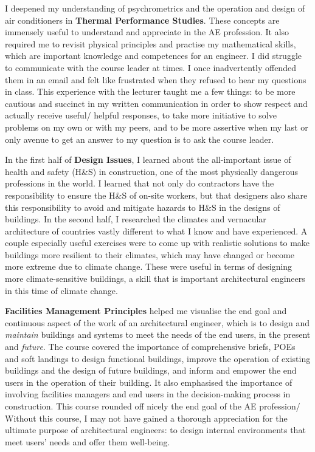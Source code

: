 I deepened my understanding of psychrometrics and the operation and design of air conditioners in \textbf{Thermal Performance Studies}.
These concepts are immensely useful to understand and appreciate in the AE profession.
It also required me to revisit physical principles and practise my mathematical skills, which are important knowledge and competences for an engineer.
I did struggle to communicate with the course leader at times.
I once inadvertently offended them in an email and felt like frustrated when they refused to hear my questions in class.
This experience with the lecturer taught me a few things: to be more cautious and succinct in my written communication in order to show respect and actually receive useful/ helpful responses, to take more initiative to solve problems on my own or with my peers, and to be more assertive when my last or only avenue to get an answer to my question is to ask the course leader.

In the first half of \textbf{Design Issues}, I learned about the all-important issue of health and safety (H\&S) in construction, one of the most physically dangerous professions in the world.
I learned that not only do contractors have the responsibility to ensure the H\&S of on-site workers, but that designers also share this responsibility to avoid and mitigate hazards to H\&S in the designs of buildings.
In the second half, I researched the climates and vernacular architecture of countries vastly different to what I know and have experienced.
A couple especially useful exercises were to come up with realistic solutions to make buildings more resilient to their climates, which may have changed or become more extreme due to climate change.
These were useful in terms of designing more climate-sensitive buildings, a skill that is important architectural engineers in this time of climate change.

\textbf{Facilities Management Principles} helped me visualise the end goal and continuous aspect of the work of an architectural engineer, which is to design and \emph{maintain} buildings and systems to meet the needs of the end users, in the present and \emph{future}.
The course covered the importance of comprehensive briefs, POEs and soft landings to design functional buildings, improve the operation of existing buildings and the design of future buildings, and inform and empower the end users in the operation of their building.
It also emphasised the importance of involving facilities managers and end users in the decision-making process in construction.
This course rounded off nicely the end goal of the AE profession/ Without this course, I may not have gained a thorough appreciation for the ultimate purpose of architectural engineers: to design internal environments that meet users' needs and offer them well-being.



